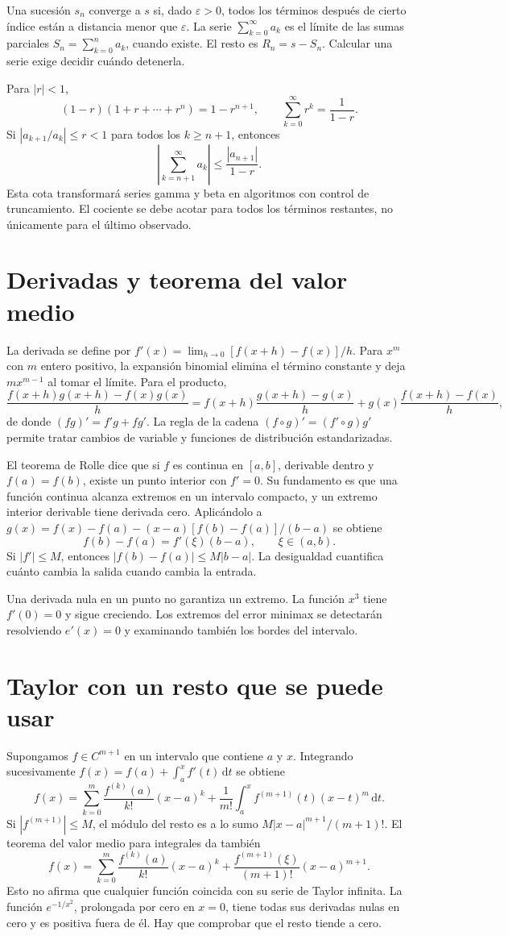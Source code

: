 \documentclass[11pt,a4paper]{article}
\newcommand{\dd}{\,\mathrm d}
\theoremstyle{definition}
\newcommand{\eps}{\varepsilon}
\begin{document}
Una sucesión $s_n$ converge a $s$ si, dado $\eps>0$, todos los términos después de cierto índice están a distancia menor que $\eps$. La serie $\sum_{k=0}^\infty a_k$ es el límite de las sumas parciales $S_n=\sum_{k=0}^n a_k$, cuando existe. El resto es $R_n=s-S_n$. Calcular una serie exige decidir cuándo detenerla.

Para $|r|<1$,
\[
(1-r)(1+r+\cdots+r^n)=1-r^{n+1},\qquad
\sum_{k=0}^\infty r^k=\frac1{1-r}.
\]
Si $|a_{k+1}/a_k|\le r<1$ para todos los $k\ge n+1$, entonces
\[
\left|\sum_{k=n+1}^\infty a_k\right|\le\frac{|a_{n+1}|}{1-r}.
\]
Esta cota transformará series gamma y beta en algoritmos con control de truncamiento. El cociente se debe acotar para todos los términos restantes, no únicamente para el último observado.

\section{Derivadas y teorema del valor medio}
La derivada se define por $f'(x)=\lim_{h\to0}[f(x+h)-f(x)]/h$. Para $x^m$ con $m$ entero positivo, la expansión binomial elimina el término constante y deja $mx^{m-1}$ al tomar el límite. Para el producto,
\[
\frac{f(x+h)g(x+h)-f(x)g(x)}h
=f(x+h)\frac{g(x+h)-g(x)}h
 +g(x)\frac{f(x+h)-f(x)}h,
\]
de donde $(fg)'=f'g+fg'$. La regla de la cadena $(f\circ g)'=(f'\circ g)g'$ permite tratar cambios de variable y funciones de distribución estandarizadas.

El teorema de Rolle dice que si $f$ es continua en $[a,b]$, derivable dentro y $f(a)=f(b)$, existe un punto interior con $f'=0$. Su fundamento es que una función continua alcanza extremos en un intervalo compacto, y un extremo interior derivable tiene derivada cero. Aplicándolo a
$g(x)=f(x)-f(a)-(x-a)[f(b)-f(a)]/(b-a)$ se obtiene
\[
f(b)-f(a)=f'(\xi)(b-a),\qquad \xi\in(a,b).
\]
Si $|f'|\le M$, entonces $|f(b)-f(a)|\le M|b-a|$. La desigualdad cuantifica cuánto cambia la salida cuando cambia la entrada.

Una derivada nula en un punto no garantiza un extremo. La función $x^3$ tiene $f'(0)=0$ y sigue creciendo. Los extremos del error minimax se detectarán resolviendo $e'(x)=0$ y examinando también los bordes del intervalo.

\section{Taylor con un resto que se puede usar}
Supongamos $f\in C^{m+1}$ en un intervalo que contiene $a$ y $x$. Integrando sucesivamente $f(x)=f(a)+\int_a^x f'(t)\dd t$ se obtiene
\[
f(x)=\sum_{k=0}^m\frac{f^{(k)}(a)}{k!}(x-a)^k+
\frac1{m!}\int_a^x f^{(m+1)}(t)(x-t)^m\dd t.
\]
Si $|f^{(m+1)}|\le M$, el módulo del resto es a lo sumo $M|x-a|^{m+1}/(m+1)!$. El teorema del valor medio para integrales da también
\[
f(x)=\sum_{k=0}^m\frac{f^{(k)}(a)}{k!}(x-a)^k+
\frac{f^{(m+1)}(\xi)}{(m+1)!}(x-a)^{m+1}.
\]
Esto no afirma que cualquier función coincida con su serie de Taylor infinita. La función $e^{-1/x^2}$, prolongada por cero en $x=0$, tiene todas sus derivadas nulas en cero y es positiva fuera de él. Hay que comprobar que el resto tiende a cero.
\end{document}
